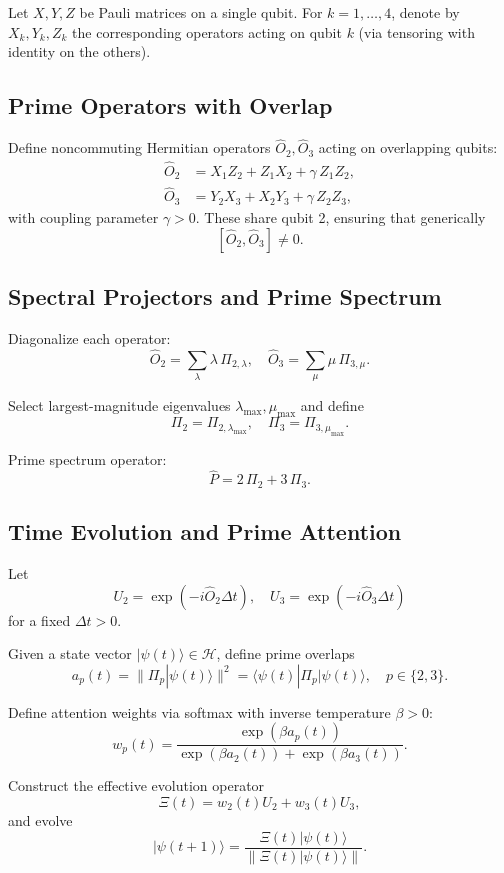\documentclass[11pt]{article}
\begin{document}
Let $X,Y,Z$ be Pauli matrices on a single qubit. For $k=1,\ldots,4$, denote by $X_k,Y_k,Z_k$ the corresponding operators acting on qubit $k$ (via tensoring with identity on the others).

\subsection{Prime Operators with Overlap}

Define noncommuting Hermitian operators $\hat{O}_2,\hat{O}_3$ acting on overlapping qubits:
\begin{align*}
\hat{O}_2 &= X_1 Z_2 + Z_1 X_2 + \gamma\, Z_1 Z_2,\\
\hat{O}_3 &= Y_2 X_3 + X_2 Y_3 + \gamma\, Z_2 Z_3,
\end{align*}
with coupling parameter $\gamma>0$. These share qubit 2, ensuring that generically
\[
[\hat{O}_2,\hat{O}_3] \neq 0.
\]

\subsection{Spectral Projectors and Prime Spectrum}

Diagonalize each operator:
\[
\hat{O}_2 = \sum_\lambda \lambda\, \Pi_{2,\lambda}, \quad
\hat{O}_3 = \sum_\mu \mu\, \Pi_{3,\mu}.
\]

Select largest-magnitude eigenvalues $\lambda_{\max},\mu_{\max}$ and define
\[
\Pi_2 = \Pi_{2,\lambda_{\max}},\quad
\Pi_3 = \Pi_{3,\mu_{\max}}.
\]

Prime spectrum operator:
\[
\hat{P} = 2\,\Pi_2 + 3\,\Pi_3.
\]

\subsection{Time Evolution and Prime Attention}

Let
\[
U_2 = \exp(-i \hat{O}_2 \Delta t),\quad
U_3 = \exp(-i \hat{O}_3 \Delta t)
\]
for a fixed $\Delta t>0$.

Given a state vector $|\psi(t)\rangle \in \mathcal{H}$, define prime overlaps
\[
a_p(t) = \|\Pi_p |\psi(t)\rangle\|^2 = \langle \psi(t)|\Pi_p|\psi(t)\rangle,\quad p\in\{2,3\}.
\]

Define attention weights via softmax with inverse temperature $\beta>0$:
\[
w_p(t) = \frac{\exp(\beta a_p(t))}{\exp(\beta a_2(t))+\exp(\beta a_3(t))}.
\]

Construct the effective evolution operator
\[
\Xi(t) = w_2(t) U_2 + w_3(t) U_3,
\]
and evolve
\[
|\psi(t+1)\rangle = \frac{\Xi(t)|\psi(t)\rangle}{\|\Xi(t)|\psi(t)\rangle\|}.
\]
\end{document}
